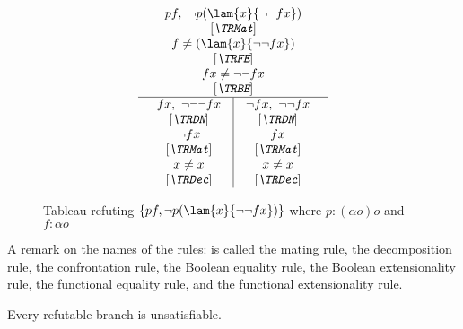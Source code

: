 \begin{figure}[t]
\begin{equation*}
  \begin{array}{c}
    pf,~\neg p(\lam{x}{\neg\neg fx}) \\
    {\mbox{[${\emph{\TRMat}}$]}} \\
    f\neq(\lam{x}{\neg\neg fx}) \\
    {\mbox{[${\emph{\TRFE}}$]}} \\
    fx\neq\neg\neg fx \\
    {\mbox{[${\emph{\TRBE}}$]}} \\
    \hline
    \begin{array}{c|c}
      \begin{array}{c}
        fx,~\neg\neg\neg fx\\
        {\mbox{[${\emph{\TRDN}}$]}} \\
        \neg fx\\
        {\mbox{[${\emph{\TRMat}}$]}} \\
        x\neq x
        \\ {\mbox{[${\emph{\TRDec}}$]}}
      \end{array}
      &
      \begin{array}{c}
        \neg fx,~\neg\neg fx \\
        {\mbox{[${\emph{\TRDN}}$]}} \\
        fx\\
        {\mbox{[${\emph{\TRMat}}$]}} \\
        x\neq x
        \\ {\mbox{[${\emph{\TRDec}}$]}}
      \end{array}
    \end{array}
  \end{array}
\end{equation*}  
\caption{Tableau refuting $\{pf,\neg p(\lam{x}{\neg\neg fx})\}$
  where $p:(\alpha o)o$ and $f:\alpha o$}
\label{fig:refutation}
\end{figure}

A remark on the names of the rules: \TRMat is called
the mating rule, \TRDec the decomposition rule, \TRCon
the confrontation rule, \TRBQ the Boolean equality rule, \TRBE
the Boolean extensionality rule, \TRFQ the functional equality
rule, and \TRFE the functional extensionality rule.

\begin{prop}[Soundness] \label{prop:ts-sound}
  Every refutable branch is unsatisfiable.
\end{prop}

